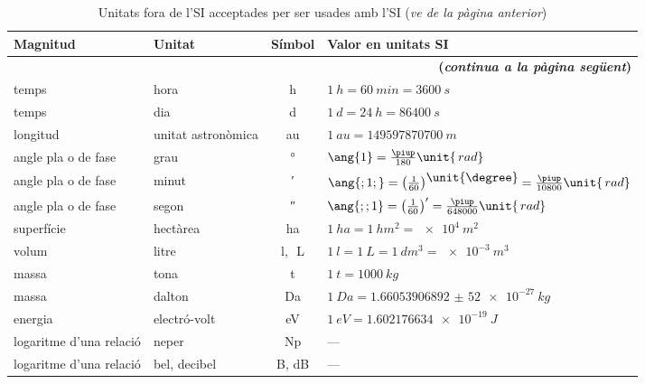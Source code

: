 \begin{ThreePartTable}
\begin{longtable}[h]{llcl}
   \caption[]{Unitats fora de l'SI acceptades per ser usades amb l'SI (\emph{ve de la pàgina
   anterior})}\\
   \toprule[1pt]
    Magnitud & Unitat &  Símbol & Valor en unitats SI\\
   \midrule
   \endhead
   \midrule
   \multicolumn{4}{r}{\sffamily\bfseries\color{NavyBlue}(\emph{continua a la pàgina següent})}
   \endfoot
   \insertTableNotes
   \endlastfoot
   temps & minut &  \unit{min}& $\qty{1}{min} = \qty{60}{s}$ \\
   temps & hora & \unit{h} & $\qty{1}{h} = \qty{60}{min} = \qty{3600}{s}$ \\
   temps & dia & \unit{d} & $\qty{1}{d} = \qty{24}{h} = \qty{86400}{s}$\\
   longitud & unitat astronòmica\tnote{\color{blue}(a)} &  \unit{au} &  $\qty{1}{au} =  \qty{149597870700}{m}$ \\
   angle pla o de fase & grau &  \unit{\degree} &   $\ang{1} = \frac{\piup}{180}\unit{\,rad}$ \\[2mm]
   angle pla o de fase & minut & \unit{\arcminute} & $\ang{;1;} = \big(\frac{1}{60}\big)\raisebox{1.5mm}{\unit{\degree}} = \frac{\piup}{10800}\unit{\,rad}$ \\[2mm]
   angle pla  o de fase & segon & \unit{\arcsecond} & $\ang{;;1} = \big(\frac{1}{60}\big)' = \frac{\piup}{648000}\unit{\,rad}$ \\[2mm]
   superfície & hectàrea\tnote{\color{blue}(b)} & \unit{ha} & $\qty{1}{ha} = \qty{1}{hm^2} = \qty[print-unity-mantissa = false]{e4}{m^2}$\\
   volum & litre &  \unit{l},\unit{\,L}\tnote{\color{blue}(c)} & $\qty{1}{l} = \qty{1}{L} = \qty{1}{dm^3} = \qty[print-unity-mantissa = false]{e-3}{m^3}$ \\
   massa & tona\tnote{\color{blue}(d)} & \unit{t} & $\qty{1}{t} = \qty{1000}{kg}$\\
   massa & dalton\tnote{\color{blue}(e)} & Da & $\qty{1}{Da} = \qty{1,660 539 068 92(52)e-27}{kg}$\\
   energia & electró-volt\tnote{\color{blue}(f)} & eV & $\qty{1}{eV} = \qty{1,602176634e-19}{J}$ \\
   logaritme d'una relació & neper\tnote{\color{blue}(g)} & \unit{Np} & ---\\
   logaritme d'una relació & bel, decibel\tnote{\color{blue}(g)} &  \unit{B}, \unit{dB} & ---\\
   \bottomrule[1pt]
\end{longtable}
\end{ThreePartTable}
\index{\unit{\degree}}


